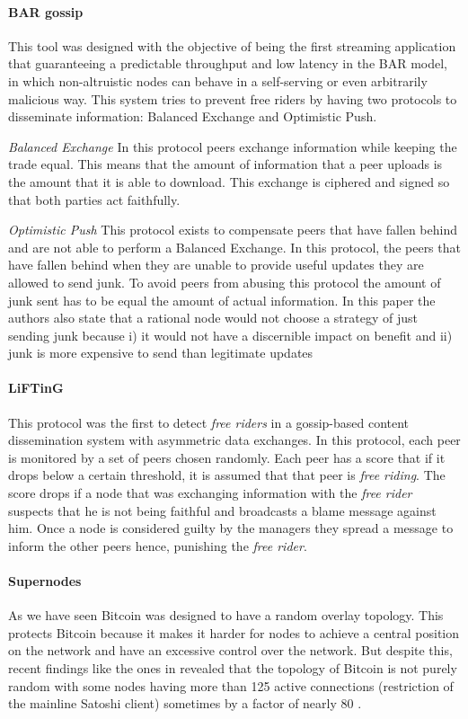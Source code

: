 \paragraph*{\textbf{BAR gossip} \cite{li2006bar}}
This tool was designed with the objective of being the first streaming application that guaranteeing a predictable throughput and low latency in the BAR model, in which non-altruistic nodes can behave in a self-serving or even arbitrarily malicious way. This system tries to prevent free riders by having two protocols to disseminate information: Balanced Exchange and Optimistic Push.

\textit{Balanced Exchange} In this protocol peers exchange information while keeping the trade equal. This means that the amount of information that a peer uploads is the amount that it is able to download. This exchange is ciphered and signed so that both parties act faithfully.

\textit{Optimistic Push} This protocol exists to compensate peers that have fallen behind and are not able to perform a Balanced Exchange. In this protocol, the peers that have fallen behind when they are unable to provide useful updates they are allowed to send junk. To avoid peers from abusing this protocol the amount of junk sent has to be equal the amount of actual information. In this paper the authors also state that a rational node would not choose a strategy of just sending junk because i) it would not have a discernible impact on benefit and ii) junk is more expensive to send than legitimate updates

\paragraph*{\textbf{LiFTinG} \cite{guerraoui2010lifting}}
This protocol was the first to detect \textit{free riders} in a gossip-based content dissemination system with asymmetric data exchanges.
In this protocol, each peer is monitored by a set of peers chosen randomly. Each peer has a score that if it drops below a certain threshold, it is assumed that that peer is \textit{free riding}. The score drops if a node that was exchanging information with the \textit{free rider} suspects that he is not being faithful and broadcasts a blame message against him. Once a node is considered guilty by the managers they spread a message to inform the other peers hence, punishing the \textit{free rider}.

\paragraph*{\textbf{Supernodes}} As we have seen Bitcoin was designed to have a random overlay topology. This protects Bitcoin because it makes it harder for nodes to achieve a central position on the network and have an excessive control over the network. But despite this, recent findings like the ones in \cite{miller2015discovering} revealed that the topology of Bitcoin is not purely random with some nodes having more than 125 active connections (restriction of the mainline Satoshi client) sometimes by a factor of nearly 80 \cite{miller2015discovering}.

